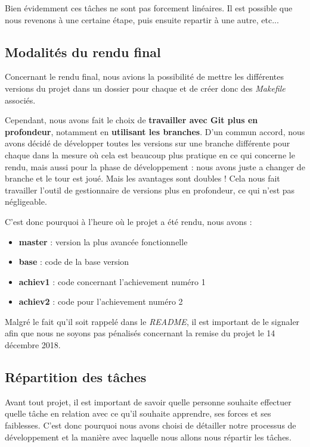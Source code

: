 \documentclass{article}
\begin{document}
Bien évidemment ces tâches ne sont pas forcement linéaires. Il est possible que nous revenons à une certaine étape, puis ensuite repartir à une autre, etc...


\subsection{Modalités du rendu final}
\label{subsct:modalite_rendu}

Concernant le rendu final, nous avions la possibilité de mettre les différentes versions du projet dans un dossier pour chaque et de créer donc des \textit{Makefile} associés.

Cependant, nous avons fait le choix de \textbf{travailler avec Git plus en profondeur}, notamment en \textbf{utilisant les branches}. D'un commun accord, nous avons décidé de développer toutes les versions sur une branche différente pour chaque dans la mesure où cela est beaucoup plus pratique en ce qui concerne le rendu, mais aussi pour la phase de développement : nous avons juste a changer de branche et le tour est joué. Mais les avantages sont doubles ! Cela nous fait travailler l'outil de gestionnaire de versions plus en profondeur, ce qui n'est pas négligeable.

\indent C'est donc pourquoi à l'heure où le projet a été rendu, nous avons :
\begin{itemize}
    \item \textbf{master} : version la plus avancée fonctionnelle
    \item \textbf{base} : code de la base version
    \item \textbf{achiev1} : code concernant l'achievement numéro 1
    \item \textbf{achiev2} : code pour l'achievement numéro 2
\end{itemize}

Malgré le fait qu'il soit rappelé dans le \textit{README}, il est important de le signaler afin que nous ne soyons pas pénalisés concernant la remise du projet le 14 décembre 2018.


\subsection{Répartition des tâches}
\label{subsct:taches}

Avant tout projet, il est important de savoir quelle personne souhaite effectuer quelle tâche en relation avec ce qu'il souhaite apprendre, ses forces et ses faiblesses. C'est donc pourquoi nous avons choisi de détailler notre processus de développement et la manière avec laquelle nous allons nous répartir les tâches.
\end{document}
